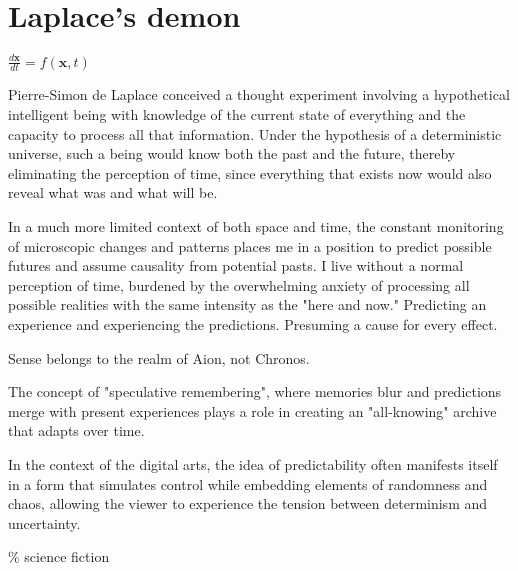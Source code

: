 \chapter*{Laplace's demon}
\begin{center}
\vspace{2cm}
\begin{flushright}
\large
\textit{$\frac{d\mathbf{x}}{dt} = f(\mathbf{x}, t)$ }
\end{flushright}
\vspace{2cm}
\end{center}
\normalsize

Pierre-Simon de Laplace conceived a thought experiment involving a hypothetical intelligent being with knowledge of the current state of everything and the capacity to process all that information. Under the hypothesis of a deterministic universe, such a being would know both the past and the future, thereby eliminating the perception of time, since everything that exists now would also reveal what was and what will be.

In a much more limited context of both space and time, the constant monitoring of microscopic changes and patterns places me in a position to predict possible futures and assume causality from potential pasts. I live without a normal perception of time, burdened by the overwhelming anxiety of processing all possible realities with the same intensity as the "here and now." Predicting an experience and experiencing the predictions. Presuming a cause for every effect. 

Sense belongs to the realm of Aion, not Chronos. \citep{deleuze1969}

The concept of "speculative remembering", where memories blur and predictions merge with present experiences plays a role in creating an "all-knowing" archive that adapts over time. 
\citep{dutt2024}

In the context of the digital arts, the idea of predictability often manifests itself in a form that simulates control while embedding elements of randomness and chaos, allowing the viewer to experience the tension between determinism and uncertainty.

{\scriptsize \textcolor{comment}{\%  science fiction}}

